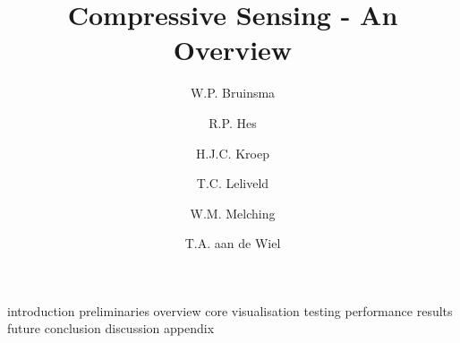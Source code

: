\documentclass[a4paper, openany, oneside]{memoir}
\title{Compressive Sensing - An Overview}
\author{W.P. Bruinsma \and R.P. Hes \and H.J.C. Kroep \and T.C. Leliveld \and W.M. Melching \and T.A. aan de Wiel}
\begin{document}
{introduction}
{preliminaries}
{overview}
{core}
{visualisation}
{testing}
{performance}
{results}
{future}
{conclusion}
{discussion}
{appendix}
\end{document}
